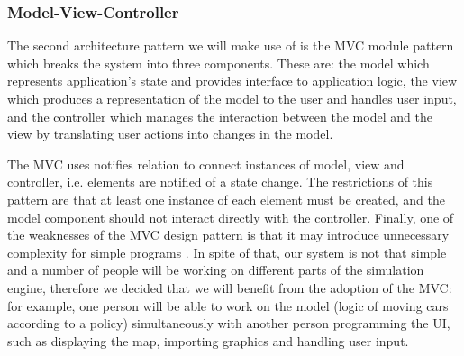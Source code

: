 \documentclass{article}
\begin{document}
\subsubsection{Model-View-Controller}
The second architecture pattern we will make use of is the MVC module pattern which breaks the system into three components. These are: the model which represents application's state and provides interface to application logic, the view which produces a representation of the model to the user and handles user input, and the controller which manages the interaction between the model and the view by translating user actions into changes in the model. 

The MVC uses notifies relation to connect instances of model, view and controller, i.e. elements are notified of a state change. The restrictions of this pattern are that at least one instance of each element must be created, and the model component should not interact directly with the controller. Finally, one of the weaknesses of the MVC design pattern is that it may introduce unnecessary complexity for simple programs \cite{bass2007software}. In spite of that, our system is not that simple and a number of people will be working on different parts of the simulation engine, therefore we decided that we will benefit from the adoption of the MVC: for example, one person will be able to work on the model (logic of moving cars according to a policy) simultaneously with another person programming the UI, such as displaying the map, importing graphics and handling user input. 
\end{document}
